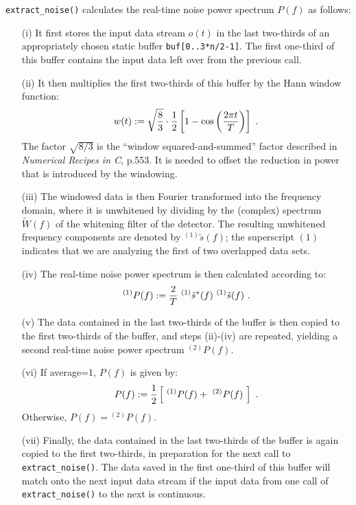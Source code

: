 {\tt extract\_noise()} calculates the real-time noise power spectrum 
$P(f)$ as follows:
%
\begin{itemize}
\item[(i)] It first stores the input data stream $o(t)$ in the last
two-thirds of an appropriately chosen static buffer
{\tt buf[0..3*n/2-1]}.
The first one-third of this buffer contains the input data left
over from the previous call.
%
\item[(ii)] It then multiplies the first two-thirds of this buffer
by the Hann window function:
%
\begin{equation}
w(t):=\sqrt{{8\over 3}}\cdot{1\over 2}
\left[1-\cos\left({2\pi t\over T}\right)\right]\ .
\end{equation}
%
The factor $\sqrt{8/3}$ is the ``window squared-and-summed'' factor
described in {\it Numerical Recipes in C}, p.553.
It is needed to offset the reduction in power that is introduced by
the windowing.
%
\item[(iii)] The windowed data is then Fourier transformed into the
frequency domain, where it is unwhitened by dividing by the (complex)
spectrum $\tilde W(f)$ of the whitening filter of the detector.
The resulting unwhitened frequency components are denoted by 
${}^{(1)}\tilde s(f)$; 
the superscript $(1)$ indicates that we are analyzing the first of 
two overlapped data sets.
%
\item[(iv)] The real-time noise power spectrum is then calculated
according to:
%
\begin{equation}
{}^{(1)}P(f):={2\over T}\ {}^{(1)}\tilde s^*(f)\ {}^{(1)}\tilde s(f)\ .
\end{equation}
%
\item[(v)] The data contained in the last two-thirds of the buffer is 
then copied to the first two-thirds of the buffer, and steps (ii)-(iv)
are repeated, yielding a second real-time noise power spectrum 
${}^{(2)}P(f)$.
%
\item[(vi)] If {average=1}, $P(f)$ is given by:
%
\begin{equation}
P(f):={1\over 2}\left[\ {}^{(1)}P(f)+\ {}^{(2)}P(f)\ \right]\ .
\end{equation}
%
Otherwise, $P(f)={}^{(2)}P(f)$.
%
\item[(vii)] Finally, the data contained in the last two-thirds of the
buffer is again copied to the first two-thirds, in preparation for the
next call to {\tt extract\_noise()}.
The data saved in the first one-third of this buffer will match 
onto the next input data stream if the input data from one call of 
{\tt extract\_noise()} to the next is continuous.
\end{itemize}

